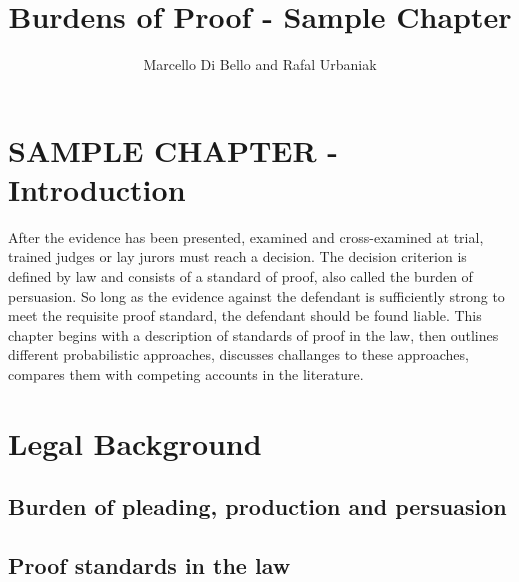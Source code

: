 \documentclass[10pt,dvipsnames]{scrartcl}
\title{Burdens of Proof - Sample Chapter}
\author{Marcello Di Bello and Rafal Urbaniak}
\date{}
\begin{document}
\maketitle

\tableofcontents

\hypertarget{sample-chapter---introduction}{%
\section{SAMPLE CHAPTER -
Introduction}\label{sample-chapter---introduction}}

After the evidence has been presented, examined and cross-examined at
trial, trained judges or lay jurors must reach a decision. The decision
criterion is defined by law and consists of a standard of proof, also
called the burden of persuasion. So long as the evidence against the
defendant is sufficiently strong to meet the requisite proof standard,
the defendant should be found liable. This chapter begins with a
description of standards of proof in the law, then outlines different
probabilistic approaches, discusses challanges to these approaches,
compares them with competing accounts in the literature.

\hypertarget{legal-background}{%
\section{Legal Background}\label{legal-background}}

\label{subsec:legal-background}

\hypertarget{burden-of-pleading-production-and-persuasion}{%
\subsection{Burden of pleading, production and
persuasion}\label{burden-of-pleading-production-and-persuasion}}

\hypertarget{proof-standards-in-the-law}{%
\subsection{Proof standards in the
law}\label{proof-standards-in-the-law}}
\end{document}
